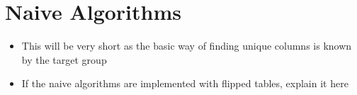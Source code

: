 \section{Naive Algorithms}
\begin{itemize}
  \item This will be very short as the basic way of finding unique columns is known by the target group
  \item If the naive algorithms are implemented with flipped tables, explain it here
\end{itemize}